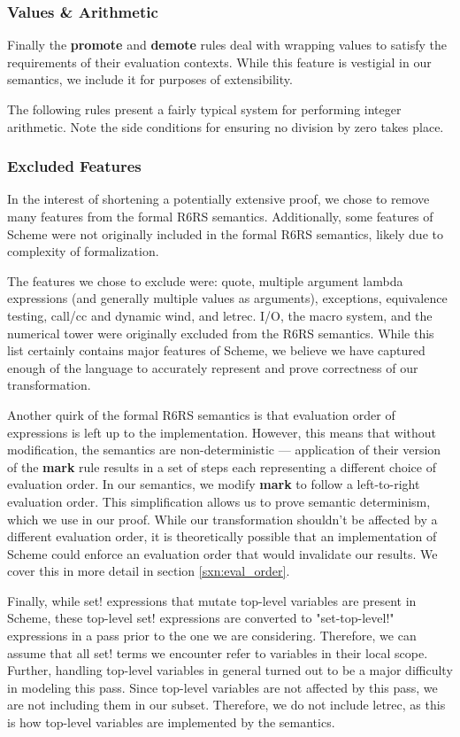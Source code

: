 \subsubsection{Values \& Arithmetic}\label{sxn:sem_vals_math}
Finally the \textbf{promote} and \textbf{demote} rules deal with wrapping values to satisfy the requirements of their evaluation contexts. While this feature is vestigial in our semantics, we include it for purposes of extensibility.

The following rules present a fairly typical system for performing integer arithmetic. Note the side conditions for ensuring no division by zero takes place.

\subsubsection{Excluded Features\label{sxn:excluded}}
In the interest of shortening a potentially extensive proof, we chose to remove many features from the formal R6RS semantics. Additionally, some features of Scheme were not originally included in the formal R6RS semantics, likely due to complexity of formalization.

The features we chose to exclude were: quote, multiple argument lambda expressions (and generally multiple values as arguments), exceptions, equivalence testing, call/cc and dynamic wind, and letrec. I/O, the macro system, and the numerical tower were originally excluded from the R6RS semantics. While this list certainly contains major features of Scheme, we believe we have captured enough of the language to accurately represent and prove correctness of our transformation.

Another quirk of the formal R6RS semantics is that evaluation order of expressions is left up to the implementation. However, this means that without modification, the semantics are non-deterministic --- application of their version of the \textbf{mark} rule results in a set of steps each representing a different choice of evaluation order. In our semantics, we modify \textbf{mark} to follow a left-to-right evaluation order. This simplification allows us to prove semantic determinism, which we use in our proof. While our transformation shouldn't be affected by a different evaluation order, it is theoretically possible that an implementation of Scheme could enforce an evaluation order that would invalidate our results. We cover this in more detail in section \ref{sxn:eval_order}.

Finally, while set! expressions that mutate top-level variables are present in Scheme, these top-level set! expressions are converted to "set-top-level!" expressions in a pass prior to the one we are considering. Therefore, we can assume that all set! terms we encounter refer to variables in their local scope. Further, handling top-level variables in general turned out to be a major difficulty in modeling this pass. Since top-level variables are not affected by this pass, we are not including them in our subset. Therefore, we do not include letrec, as this is how top-level variables are implemented by the semantics.
